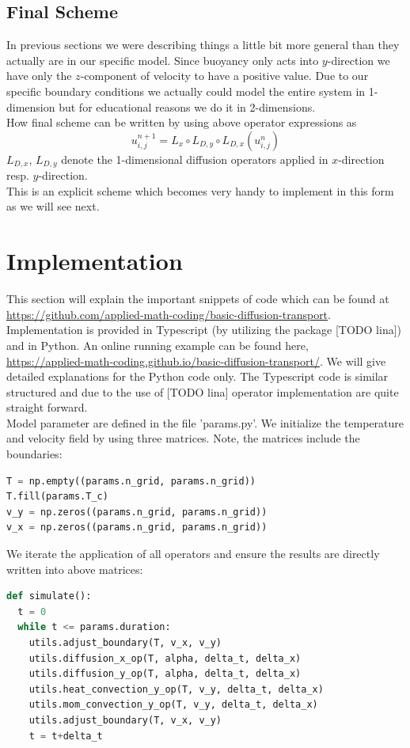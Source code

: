 \documentclass[]{article}
\begin{document}
\subsection{Final Scheme}
In previous sections we were describing things a little bit more general than they actually are in our specific model. Since buoyancy only acts into $y$-direction we have only the $z$-component of velocity to have a positive value. Due to our specific boundary conditions we actually could model the entire system in 1-dimension but for educational reasons we do it in 2-dimensions.\\
How final scheme can be written by using above operator expressions as
\begin{equation} \label{final_scheme_expr}
u_{i,j}^{n+1}=L_{x}\circ L_{D,y}\circ L_{D,x}(u_{i,j}^{n})
\end{equation}
$L_{D,x}$, $L_{D,y}$ denote the 1-dimensional diffusion operators applied in $x$-direction resp. $y$-direction.\\
This is an explicit scheme which becomes very handy to implement in this form as we will see next.

\section{Implementation}
This section will explain the important snippets of code which can be found at \url{https://github.com/applied-math-coding/basic-diffusion-transport}. \\
Implementation is provided in Typescript (by utilizing the package [TODO lina]) and in Python.
An online running example can be found here,\\
 \url{https://applied-math-coding.github.io/basic-diffusion-transport/}.
We will give detailed explanations for the Python code only. The Typescript code is similar structured and due to the use of [TODO lina] operator implementation are quite straight forward.\\

Model parameter are defined in the file 'params.py'.
We initialize the temperature and velocity field by using three matrices. Note, the matrices
include the boundaries:
\begin{lstlisting}[language=Python]
T = np.empty((params.n_grid, params.n_grid))
T.fill(params.T_c)
v_y = np.zeros((params.n_grid, params.n_grid))
v_x = np.zeros((params.n_grid, params.n_grid))
\end{lstlisting}

We iterate the application of all operators and ensure the results are directly written
into above matrices:
\begin{lstlisting}[language=Python]
def simulate():
  t = 0
  while t <= params.duration:
    utils.adjust_boundary(T, v_x, v_y)
    utils.diffusion_x_op(T, alpha, delta_t, delta_x)
    utils.diffusion_y_op(T, alpha, delta_t, delta_x)
    utils.heat_convection_y_op(T, v_y, delta_t, delta_x)
    utils.mom_convection_y_op(T, v_y, delta_t, delta_x)
    utils.adjust_boundary(T, v_x, v_y)
    t = t+delta_t
\end{lstlisting}
\end{document}
